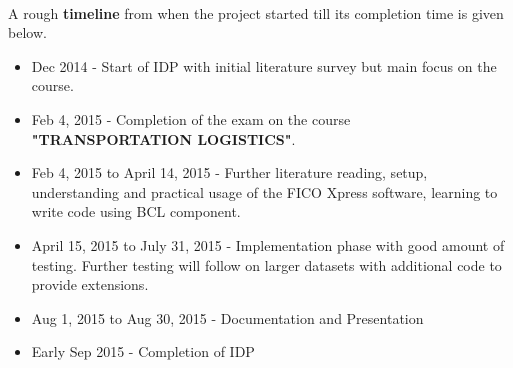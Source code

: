 \documentclass[a4paper, 12pt]{article}
\begin{document}
\noindent
\\
A rough \textbf{timeline} from when the project started till its completion time is given below.
\begin{itemize}
\item Dec 2014 - Start of IDP with initial literature survey but main focus on the course.
\item Feb 4, 2015 - Completion of the exam on the course \textbf{"TRANSPORTATION LOGISTICS"}.
\item Feb 4, 2015 to April 14, 2015 - Further literature reading, setup, understanding and practical usage of the FICO Xpress software, learning to write code using BCL component.
\item April 15, 2015 to July 31, 2015 - Implementation phase with good amount of testing. Further testing will follow on larger datasets with additional code to provide extensions.
\item Aug 1, 2015 to Aug 30, 2015 - Documentation and Presentation
\item Early Sep 2015 - Completion of IDP
\end{itemize}
\end{document}
